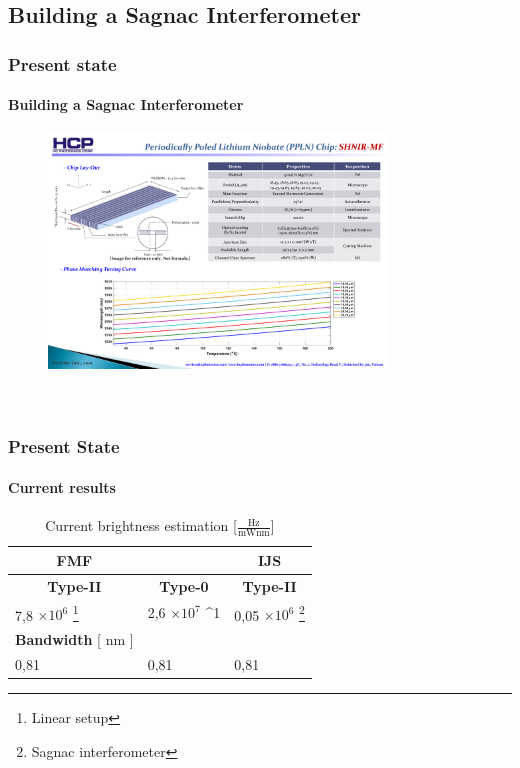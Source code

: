 \documentclass[serif,8pt]{beamer}
\begin{document}
\subsection{Building a Sagnac Interferometer}
\begin{frame}[t]
	\frametitle{Present state}
	\framesubtitle{Building a Sagnac Interferometer}
	  \pause
	\begin{figure}[!ht]
	  \centering
	  \includegraphics[width=9cm]{Type0Gratings.pdf}
	  \caption{\textcolor{white}{Specifications from the crystal manufacturer.\\\textit{Source: HC Photonics Corp.}}}
	\end{figure}
\end{frame}
\usebackgroundtemplate{}

\begin{frame}
	\frametitle{Present State}
	\framesubtitle{Current results}
	\begin{table}
		\begin{center}
			\caption{Current brightness estimation [$\frac{\text{Hz}}{\text{mWnm}}$]}
			\begin{tabular}[c|c|c]{|ll|l|}
				\hline
				\multicolumn{1}{|c}{\hfill\textbf{FMF}\hfill} &&
				\multicolumn{1}{c|}{\textbf{IJS}} \\
				\hline
				\multicolumn{1}{|c|}{\textbf{Type-II}} &
				\multicolumn{1}{c|}{\textbf{Type-0}} &
				\multicolumn{1}{c|}{\textbf{Type-II}} \\
				\hline
				7,8 $\times10^6$ \footnote{Linear setup} & 2,6 $\times 10^7 $  ^1 & 0,05 $\times 10^6$ \footnote{Sagnac interferometer} \\
				\hline
				\multicolumn{1}{|c}{\textbf{Bandwidth} [ nm ]} &\multicolumn{1}{c}{ } & \multicolumn{1}{c|}{ }  \\
				\hline
				0,81 & 0,81 & 0,81\\
				\hline
			\end{tabular}
		\end{center}
	\end{table}
\end{frame}
\end{document}

